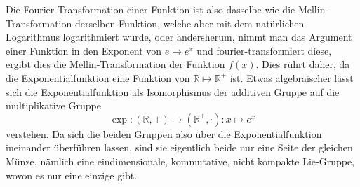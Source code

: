 Die Fourier-Transformation einer Funktion ist also dasselbe wie die 
Mellin-Transformation derselben Funktion, welche aber mit dem 
natürlichen Logarithmus logarithmiert wurde, oder andersherum, 
nimmt man das Argument einer Funktion in den Exponent von 
$e \mapsto e^x$ und fourier-transformiert diese, ergibt dies die 
Mellin-Transformation der Funktion $f(x)$.
Dies rührt daher, da die Exponentialfunktion eine Funktion von 
$\mathbb{R} \mapsto \mathbb{R^+}$ ist.
Etwas algebraischer lässt sich die Exponentialfunktion als 
Isomorphismus der additiven Gruppe auf die multiplikative Gruppe 
\[
\exp : (\mathbb{R},+) \to (\mathbb{R^+},\cdot):x \mapsto e^x
\]
verstehen. 
Da sich die beiden Gruppen also über die Exponentialfunktion 
ineinander überführen lassen, sind sie eigentlich beide nur eine Seite 
der gleichen Münze, nämlich eine eindimensionale, kommutative, nicht 
kompakte Lie-Gruppe, wovon es nur eine einzige gibt.
\medskip

